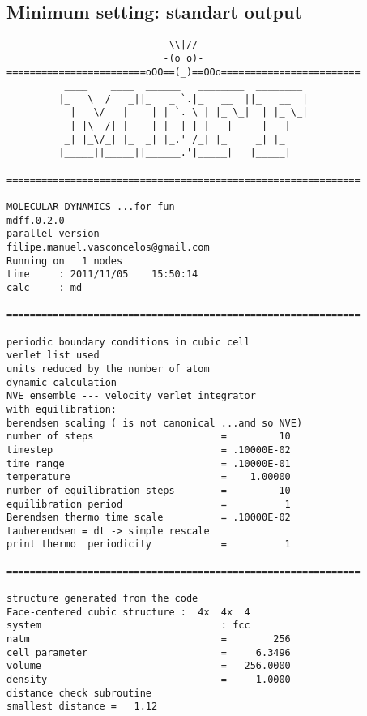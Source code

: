 \documentclass[a4paper]{article}
\begin{document}
\subsection{Minimum setting: standart output}
\begin{verbatim}
                            \\|//                    
                           -(o o)-                           
========================oOO==(_)==OOo========================
          ____    ____  ______   ________  ________  
         |_   \  /   _||_   _ `.|_   __  ||_   __  | 
           |   \/   |    | | `. \ | |_ \_|  | |_ \_| 
           | |\  /| |    | |  | | |  _|     |  _|    
          _| |_\/_| |_  _| |_.' /_| |_     _| |_     
         |_____||_____||______.'|_____|   |_____|    
  
=============================================================

MOLECULAR DYNAMICS ...for fun                 
mdff.0.2.0
parallel version
filipe.manuel.vasconcelos@gmail.com  
Running on   1 nodes                  
time     : 2011/11/05    15:50:14
calc     : md                                                          

=============================================================

periodic boundary conditions in cubic cell     
verlet list used 
units reduced by the number of atom
dynamic calculation
NVE ensemble --- velocity verlet integrator    
with equilibration:             
berendsen scaling ( is not canonical ...and so NVE)
number of steps                      =         10
timestep                             = .10000E-02
time range                           = .10000E-01
temperature                          =    1.00000
number of equilibration steps        =         10
equilibration period                 =          1
Berendsen thermo time scale          = .10000E-02
tauberendsen = dt -> simple rescale
print thermo  periodicity            =          1

=============================================================

structure generated from the code
Face-centered cubic structure :  4x  4x  4  
system                               : fcc                                                         
natm                                 =        256
cell parameter                       =     6.3496
volume                               =   256.0000
density                              =     1.0000
distance check subroutine
smallest distance =   1.12


\end{verbatim}
\end{document}
